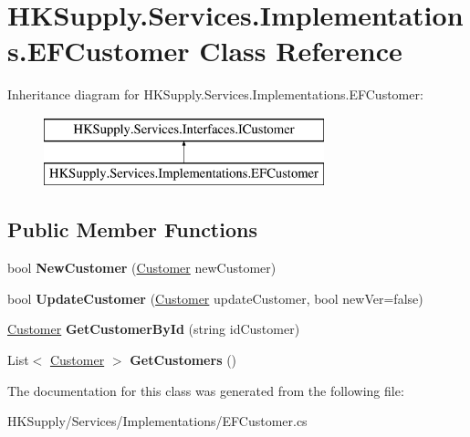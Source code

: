 \hypertarget{class_h_k_supply_1_1_services_1_1_implementations_1_1_e_f_customer}{}\section{H\+K\+Supply.\+Services.\+Implementations.\+E\+F\+Customer Class Reference}
\label{class_h_k_supply_1_1_services_1_1_implementations_1_1_e_f_customer}
Inheritance diagram for H\+K\+Supply.\+Services.\+Implementations.\+E\+F\+Customer\+:\begin{figure}[H]
\begin{center}
\leavevmode
\includegraphics[height=2.000000cm]{class_h_k_supply_1_1_services_1_1_implementations_1_1_e_f_customer}
\end{center}
\end{figure}
\subsection*{Public Member Functions}
\begin{DoxyCompactItemize}
\item 
\mbox{\label{class_h_k_supply_1_1_services_1_1_implementations_1_1_e_f_customer_a8caba8c3706d212709d73ff4e2e94e1e}} 
bool {\bfseries New\+Customer} (\hyperlink{class_h_k_supply_1_1_models_1_1_customer}{Customer} new\+Customer)
\item 
\mbox{\label{class_h_k_supply_1_1_services_1_1_implementations_1_1_e_f_customer_af7bd47be2eff71310dd5ad5e4157bfa4}} 
bool {\bfseries Update\+Customer} (\hyperlink{class_h_k_supply_1_1_models_1_1_customer}{Customer} update\+Customer, bool new\+Ver=false)
\item 
\mbox{\label{class_h_k_supply_1_1_services_1_1_implementations_1_1_e_f_customer_a88c703ed6108d30abbed42876d524fb3}} 
\hyperlink{class_h_k_supply_1_1_models_1_1_customer}{Customer} {\bfseries Get\+Customer\+By\+Id} (string id\+Customer)
\item 
\mbox{\label{class_h_k_supply_1_1_services_1_1_implementations_1_1_e_f_customer_a2688e050817d243a2c424293b2922005}} 
List$<$ \hyperlink{class_h_k_supply_1_1_models_1_1_customer}{Customer} $>$ {\bfseries Get\+Customers} ()
\end{DoxyCompactItemize}


The documentation for this class was generated from the following file\+:\begin{DoxyCompactItemize}
\item 
H\+K\+Supply/\+Services/\+Implementations/E\+F\+Customer.\+cs\end{DoxyCompactItemize}
